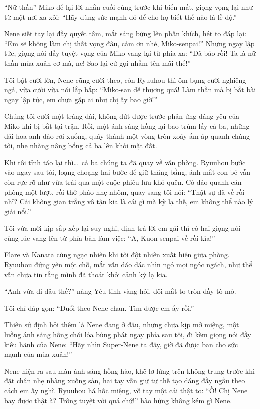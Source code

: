 \documentclass[../main.tex]{subfiles}
\begin{document}
``Nữ thần'' Miko để lại lời nhắn cuối cùng trước khi biến mất, giọng vọng lại như từ một nơi xa xôi: ``Hãy dùng sức mạnh đó để cho họ biết thế nào là lễ độ.''

Nene siết tay lại đầy quyết tâm, mắt sáng bừng lên phấn khích, hét to đáp lại: ``Em sẽ không làm chị thất vọng đâu, cảm ơn nhé, Miko-senpai!'' Nhưng ngay lập tức, giọng nói đầy tuyệt vọng của Miko vang lại từ phía xa: ``Đã bảo rồi! Ta là nữ thần mùa xuân cơ mà, ne! Sao lại cứ gọi nhầm tên mãi thế!''

Tôi bật cười lớn, Nene cũng cười theo, còn Ryuuhou thì ôm bụng cười nghiêng ngả, vừa cười vừa nói lắp bắp: ``Miko-san dễ thương quá! Làm thần mà bị bắt bài ngay lập tức, em chưa gặp ai như chị ấy bao giờ!''

Chúng tôi cười một tràng dài, không dứt được trước phản ứng đáng yêu của Miko khi bị bắt tại trận. Rồi, một ánh sáng hồng lại bao trùm lấy cả ba, những dải hoa anh đào rơi xuống, quây thành một vòng tròn xoáy ấm áp quanh chúng tôi, nhẹ nhàng nâng bổng cả ba lên khỏi mặt đất.

\ct

Khi tôi tỉnh táo lại thì\dots\ cả ba chúng ta đã quay về văn phòng. Ryuuhou bước vào ngay sau tôi, loạng choạng hai bước để giữ thăng bằng, ánh mắt con bé vẫn còn rực rỡ như vừa trải qua một cuộc phiêu lưu khó quên. Cô đảo quanh căn phòng một lượt, rồi thở phào nhẹ nhõm, quay sang tôi nói: ``Thật sự đã về rồi nhỉ? Cái không gian trắng vô tận kia là cái gì mà kỳ lạ thế, em không thể nào lý giải nổi.''

Tôi vừa mới kịp sắp xếp lại suy nghĩ, định trả lời em gái thì có hai giọng nói cùng lúc vang lên từ phía bàn làm việc: ``A, Kuon-senpai về rồi kìa!''

Flare và Kanata cùng ngạc nhiên khi tôi đột nhiên xuất hiện giữa phòng. Ryuuhou đứng yên một chỗ, mắt vẫn dáo dác nhìn ngó mọi ngóc ngách, như thể vẫn chưa tin rằng mình đã thoát khỏi cảnh kỳ lạ kia.

``Anh vừa đi đâu thế?'' nàng Yêu tinh vàng hỏi, đôi mắt to tròn đầy tò mò.

Tôi chỉ đáp gọn: ``Đuổi theo Nene-chan. Tìm được em ấy rồi.''

Thiên sứ định hỏi thêm là Nene đang ở đâu, nhưng chưa kịp mở miệng, một luồng ánh sáng hồng chói lóa bùng phát ngay phía sau tôi, đi kèm giọng nói đầy kiêu hãnh của Nene: ``Hãy nhìn Super-Nene ta đây, giờ đã được ban cho sức mạnh của mùa xuân!''

Nene hiện ra sau màn ánh sáng hồng hào, khẽ lơ lửng trên không trung trước khi đặt chân nhẹ nhàng xuống sàn, hai tay vẫn giữ tư thế tạo dáng đầy ngầu theo cách em ấy nghĩ. Ryuuhou há hốc miệng, vỗ tay một cái thật to: ``Ồ! Chị Nene bay được thật à? Trông tuyệt vời quá chứ!'' hào hứng không kém gì Nene.
\end{document}
